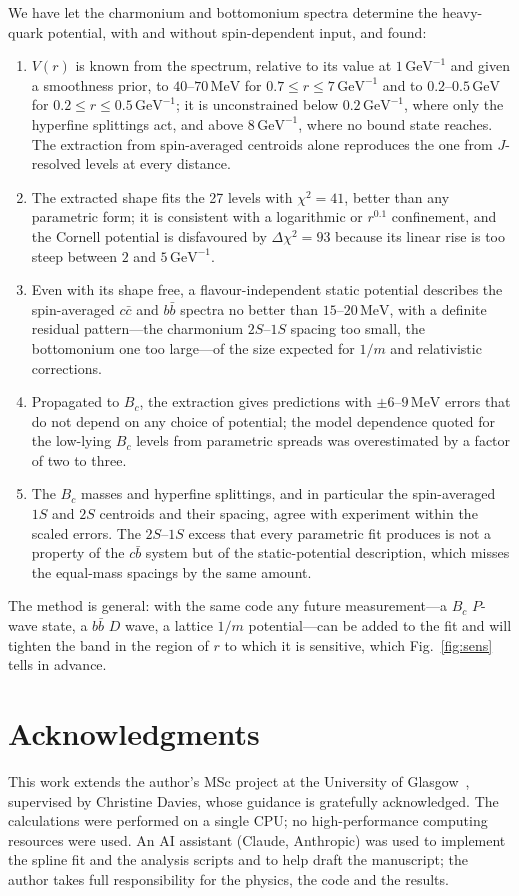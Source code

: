 \documentclass[10pt,twocolumn]{article}
\newenvironment{acknowledgments}{\section*{Acknowledgments}}{}
\newcommand{\Bc}{B_c}
\newcommand{\cc}{c\bar c}
\newcommand{\bb}{b\bar b}
\newcommand{\cb}{c\bar b}
\newcommand{\MeV}{\,\mathrm{MeV}}
\newcommand{\GeV}{\,\mathrm{GeV}}
\newcommand{\GeVi}{\,\mathrm{GeV}^{-1}}
\begin{document}
We have let the charmonium and bottomonium spectra determine the heavy-quark potential, with and without spin-dependent input, and found:
\begin{enumerate}
\item $V(r)$ is known from the spectrum, relative to its value at $1\GeVi$ and given a smoothness prior, to $40$--$70\MeV$ for $0.7\le r\le7\GeVi$ and to $0.2$--$0.5\GeV$ for $0.2\le r\le0.5\GeVi$; it is unconstrained below $0.2\GeVi$, where only the hyperfine splittings act, and above $8\GeVi$, where no bound state reaches. The extraction from spin-averaged centroids alone reproduces the one from $J$-resolved levels at every distance.
\item The extracted shape fits the 27 levels with $\chi^2=41$, better than any parametric form; it is consistent with a logarithmic or $r^{0.1}$ confinement, and the Cornell potential is disfavoured by $\Delta\chi^2=93$ because its linear rise is too steep between $2$ and $5\GeVi$.
\item Even with its shape free, a flavour-independent static potential describes the spin-averaged $\cc$ and $\bb$ spectra no better than $15$--$20\MeV$, with a definite residual pattern---the charmonium $2S$--$1S$ spacing too small, the bottomonium one too large---of the size expected for $1/m$ and relativistic corrections.
\item Propagated to $\Bc$, the extraction gives predictions with $\pm6$--$9\MeV$ errors that do not depend on any choice of potential; the model dependence quoted for the low-lying $\Bc$ levels from parametric spreads was overestimated by a factor of two to three.
\item The $\Bc$ masses and hyperfine splittings, and in particular the spin-averaged $1S$ and $2S$ centroids and their spacing, agree with experiment within the scaled errors. The $2S$--$1S$ excess that every parametric fit produces is not a property of the $\cb$ system but of the static-potential description, which misses the equal-mass spacings by the same amount.
\end{enumerate}
The method is general: with the same code any future measurement---a $\Bc$ $P$-wave state, a $\bb$ $D$ wave, a lattice $1/m$ potential---can be added to the fit and will tighten the band in the region of $r$ to which it is sensitive, which Fig.~\ref{fig:sens} tells in advance.

\begin{acknowledgments}
This work extends the author's MSc project at the University of Glasgow~\cite{OppongThesis}, supervised by Christine Davies, whose guidance is gratefully acknowledged.
The calculations were performed on a single CPU; no high-performance computing resources were used.
An AI assistant (Claude, Anthropic) was used to implement the spline fit and the analysis scripts and to help draft the manuscript; the author takes full responsibility for the physics, the code and the results.
\end{acknowledgments}
\end{document}
